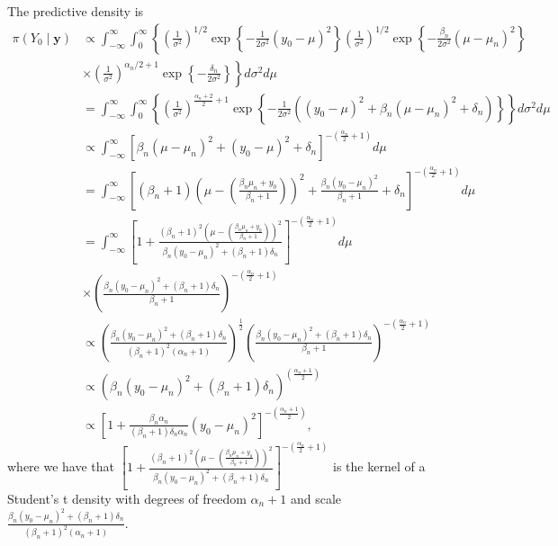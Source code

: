 \begin{enumerate}
The predictive density is
{\footnotesize{
\begin{align}
	\pi(Y_0\mid \bm{y})&\propto\int_{-\infty}^{\infty}\int_0^{\infty}\left\{ \left(\frac{1}{\sigma^2}\right)^{1/2}\exp\left\{-\frac{1}{2\sigma^2}(y_0-\mu)^2\right\}\left(\frac{1}{\sigma^2}\right)^{1/2}\exp\left\{-\frac{\beta_n}{2\sigma^2}(\mu-\mu_n)^2\right\}\right.\nonumber\\
	&\times \left.\left(\frac{1}{\sigma^2}\right)^{\alpha_n/2+1}\exp\left\{-\frac{\delta_n}{2\sigma^2}\right\}\right\}d\sigma^2d\mu\nonumber\\
	&=\int_{-\infty}^{\infty}\int_0^{\infty}\left\{ \left(\frac{1}{\sigma^2}\right)^{\frac{\alpha_n+2}{2}+1}\exp\left\{-\frac{1}{2\sigma^2}((y_0-\mu)^2+\beta_n(\mu-\mu_n)^2+\delta_n)\right\}\right\}d\sigma^2d\mu\nonumber\\
	&\propto\int_{-\infty}^{\infty}\left[\beta_n(\mu-\mu_n)^2+(y_0-\mu)^2+\delta_n\right]^{-\left(\frac{\alpha_n}{2}+1\right)}d\mu\nonumber\\
	&=\int_{-\infty}^{\infty}\left[(\beta_n+1)\left(\mu-\left(\frac{\beta_n\mu_n+y_0}{\beta_n+1}\right)\right)^2+\frac{\beta_n(y_0-\mu_n)^2}{\beta_n+1}+\delta_n\right]^{-\left(\frac{\alpha_n}{2}+1\right)}d\mu\nonumber\\
	&=\int_{-\infty}^{\infty}\left[1+\frac{(\beta_n+1)^2\left(\mu-\left(\frac{\beta_n\mu_n+y_0}{\beta_n+1}\right)\right)^2}{\beta_n(y_0-\mu_n)^2+(\beta_n+1)\delta_n}\right]^{-\left(\frac{\alpha_n}{2}+1\right)}d\mu\nonumber\\
	&\times\left(\frac{\beta_n(y_0-\mu_n)^2+(\beta_n+1)\delta_n}{\beta_n+1}\right)^{-\left(\frac{\alpha_n}{2}+1\right)}\nonumber\\
	&\propto\left(\frac{\beta_n(y_0-\mu_n)^2+(\beta_n+1)\delta_n}{(\beta_n+1)^2(\alpha_n+1)}\right)^{\frac{1}{2}}\left(\frac{\beta_n(y_0-\mu_n)^2+(\beta_n+1)\delta_n}{\beta_n+1}\right)^{-\left(\frac{\alpha_n}{2}+1\right)}\nonumber\\
	&\propto (\beta_n(y_0-\mu_n)^2+(\beta_n+1)\delta_n)^{\left(\frac{\alpha_n+1}{2}\right)}\nonumber\\
	&\propto\left[1+\frac{\beta_n\alpha_n}{(\beta_n+1)\delta_n\alpha_n}(y_0-\mu_n)^2\right]^{-\left(\frac{\alpha_n+1}{2}\right)},\nonumber
\end{align}
}}
where we have that $\left[1+\frac{(\beta_n+1)^2\left(\mu-\left(\frac{\beta_n\mu_n+y_0}{\beta_n+1}\right)\right)^2}{\beta_n(y_0-\mu_n)^2+(\beta_n+1)\delta_n}\right]^{-\left(\frac{\alpha_n}{2}+1\right)}$ is the kernel of a Student's t density with degrees of freedom $\alpha_n+1$ and scale $\frac{\beta_n(y_0-\mu_n)^2+(\beta_n+1)\delta_n}{(\beta_n+1)^2(\alpha_n+1)}$. 


\end{enumerate}
